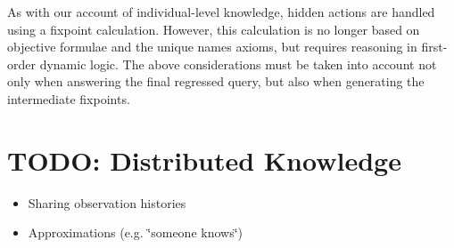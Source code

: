 As with our account of individual-level knowledge, hidden actions
are handled using a fixpoint calculation. However, this calculation
is no longer based on objective formulae and the unique names axioms,
but requires reasoning in first-order dynamic logic. The above considerations
must be taken into account not only when answering the final regressed
query, but also when generating the intermediate fixpoints.


\section{TODO: Distributed Knowledge}

\begin{itemize}
\item Sharing observation histories 
\item Approximations (e.g. \char`\"{}someone knows\char`\"{}) 
\end{itemize}
